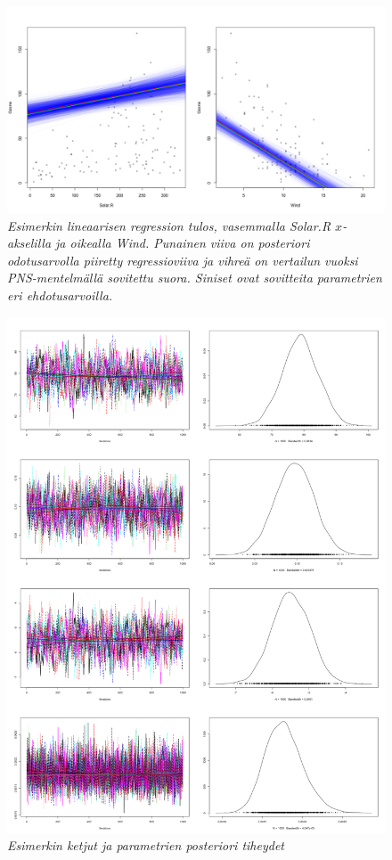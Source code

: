 \begin{figure}[h!]
	\includegraphics[width=\textwidth]{gibbsexample}
	\caption[Regressio]{\textit{Esimerkin lineaarisen regression tulos, vasemmalla Solar.R $x$-akselilla ja oikealla Wind. Punainen viiva on posteriori odotusarvolla piiretty regressioviiva ja vihreä on vertailun vuoksi PNS-mentelmällä sovitettu suora. Siniset ovat sovitteita parametrien eri ehdotusarvoilla.}}
	\label{kuva1}
\end{figure}

\begin{figure}[h!]
	\includegraphics[width=\textwidth]{gibbs2}
	\caption[]{\textit{Esimerkin ketjut ja parametrien posteriori tiheydet}}
	\label{kuva1}
\end{figure}



